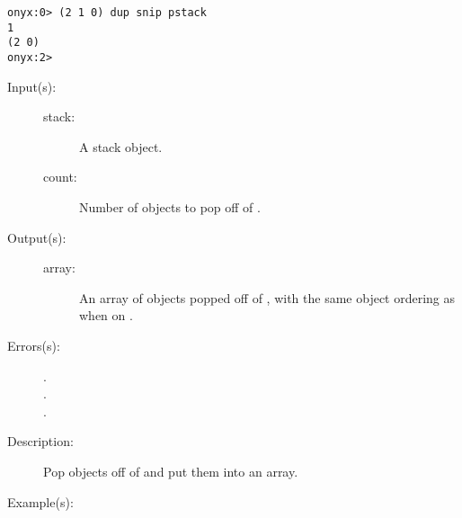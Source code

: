\begin{description}
\begin{description}
\begin{verbatim}
onyx:0> (2 1 0) dup snip pstack
1
(2 0)
onyx:2>
		\end{verbatim}
	\end{description}
\label{systemdict:snpop}
\item[{\onyxop{stack count}{snpop}{array}}: ]
	\begin{description}\item[]
	\item[Input(s): ]
		\begin{description}\item[]
		\item[stack: ]
			A stack object.
		\item[count: ]
			Number of objects to pop off of .
		\end{description}
	\item[Output(s): ]
		\begin{description}\item[]
		\item[array: ]
			An array of objects popped off of , with
			the same object ordering as when on .
		\end{description}
	\item[Errors(s): ]
		\begin{description}\item[]
		\item[.]
		\item[.]
		\item[.]
		\end{description}
	\item[Description: ]
		Pop  objects off of  and put them into
		an array.
	\item[Example(s): ]\begin{verbatim}


\end{verbatim}
\end{description}
\end{description}

